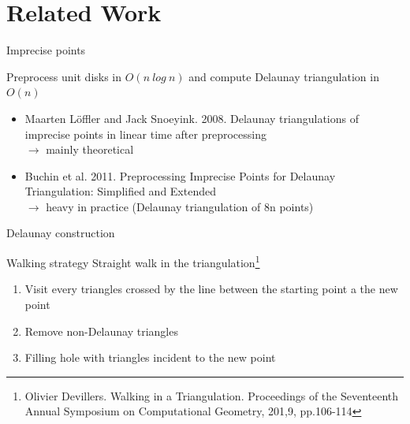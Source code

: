 \documentclass{beamer}
\begin{document}
\section{Related Work}
\frame{\tableofcontents[currentsection]}
\begin{frame}{Imprecise points}
 \begin{block}{Preprocess unit disks in $O(n~log~n)$ and compute Delaunay triangulation in $O(n)$}
  \begin{itemize}
   \item Maarten L\"offler and Jack Snoeyink. 2008. Delaunay triangulations of imprecise points in linear time after preprocessing \\
   $\rightarrow$ mainly theoretical 
   \item Buchin et al. 2011. Preprocessing Imprecise Points for Delaunay Triangulation: Simplified and Extended \\
   $\rightarrow$ heavy in practice (Delaunay triangulation of 8n points)
  \end{itemize}
 \end{block}
 
\end{frame}

\begin{frame}{Delaunay construction}
 \begin{block}{Walking strategy}
  Straight walk in the triangulation\footnote{Olivier Devillers. Walking in a Triangulation. Proceedings of the Seventeenth Annual Symposium on Computational Geometry, 201,9, pp.106-114}
  \begin{enumerate}
   \item Visit every triangles crossed by the line between the starting point a the new point
   \item Remove non-Delaunay triangles
   \item Filling hole with triangles incident to the new point
  \end{enumerate}

 \end{block}
\end{frame}
\end{document}
